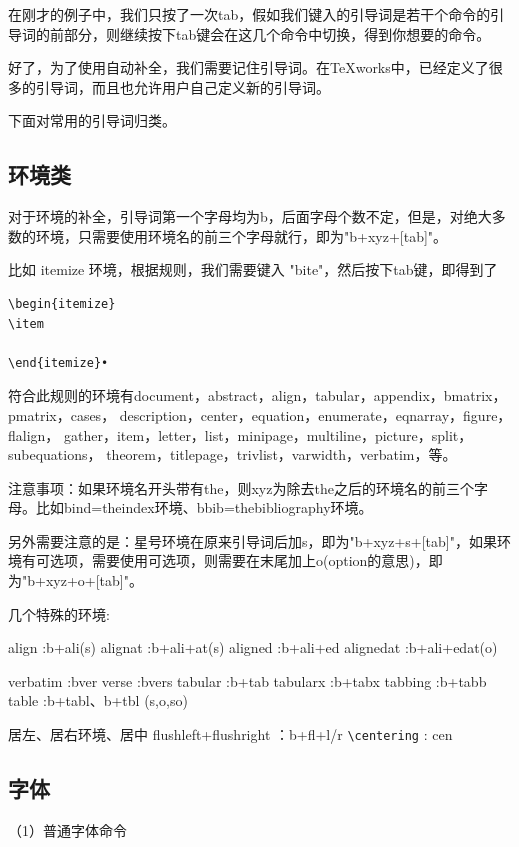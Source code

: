 在刚才的例子中，我们只按了一次tab，假如我们键入的引导词是若干个命令的引导词的前部分，则继续按下tab键会在这几个命令中切换，得到你想要的命令。
 
好了，为了使用自动补全，我们需要记住引导词。在TeXworks中，已经定义了很多的引导词，而且也允许用户自己定义新的引导词。
 
下面对常用的引导词归类。
 
\subsection{环境类}
对于环境的补全，引导词第一个字母均为b，后面字母个数不定，但是，对绝大多数的环境，只需要使用环境名的前三个字母就行，即为"b+xyz+[tab]"。
 
比如 itemize 环境，根据规则，我们需要键入 "bite"，然后按下tab键，即得到了
\begin{verbatim}
\begin{itemize}
\item
 
\end{itemize}•	
\end{verbatim}

符合此规则的环境有document，abstract，align，tabular，appendix，bmatrix，pmatrix，cases，
description，center，equation，enumerate，eqnarray，figure，flalign，
gather，item，letter，list，minipage，multiline，picture，split，subequations，
theorem，titlepage，trivlist，varwidth，verbatim，等。
 
注意事项：如果环境名开头带有the，则xyz为除去the之后的环境名的前三个字母。比如bind=theindex环境、bbib=thebibliography环境。
 
另外需要注意的是：星号环境在原来引导词后加s，即为"b+xyz+s+[tab]"，如果环境有可选项，需要使用可选项，则需要在末尾加上o(option的意思)，即为"b+xyz+o+[tab]"。
 
几个特殊的环境:

align    :b+ali(s)
alignat   :b+ali+at(s)
aligned  :b+ali+ed
alignedat :b+ali+edat(o)
 
verbatim  :bver
verse    :bvers
tabular   :b+tab
tabularx  :b+tabx
tabbing  :b+tabb
table    :b+tabl、b+tbl (s,o,so)
 
居左、居右环境、居中
flushleft+flushright ：b+fl+l/r
\verb|\centering|         : cen
 
 
 
 \subsection{字体}
（1）普通字体命令


